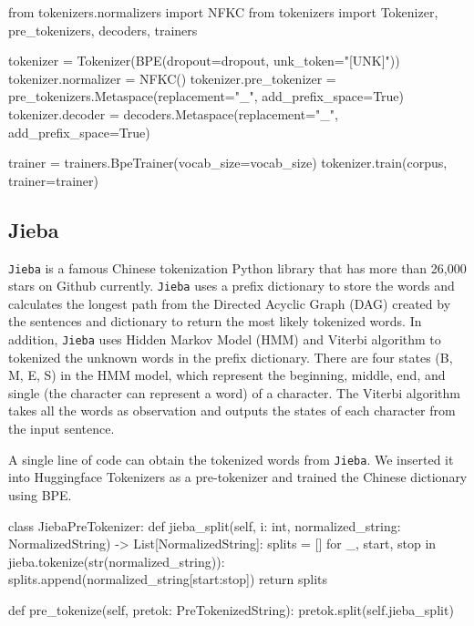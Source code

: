 \vspace{0.5cm}

\begin{python}
from tokenizers.normalizers import NFKC
from tokenizers import Tokenizer, pre_tokenizers, decoders, trainers

tokenizer = Tokenizer(BPE(dropout=dropout, unk_token="[UNK]"))
tokenizer.normalizer = NFKC()
tokenizer.pre_tokenizer = pre_tokenizers.Metaspace(replacement="_", add_prefix_space=True)
tokenizer.decoder = decoders.Metaspace(replacement="_", add_prefix_space=True)

trainer = trainers.BpeTrainer(vocab_size=vocab_size)
tokenizer.train(corpus, trainer=trainer)
\end{python}

\subsection{Jieba} \label{sec:jieba}

\texttt{Jieba} is a famous Chinese tokenization Python library that has more than 26,000 stars on Github currently. \texttt{Jieba} uses a prefix dictionary to store the words and calculates the longest path from the Directed Acyclic Graph (DAG) created by the sentences and dictionary to return the most likely tokenized words. In addition, \texttt{Jieba} uses Hidden Markov Model (HMM) and Viterbi algorithm to tokenized the unknown words in the prefix dictionary. There are four states (B, M, E, S) in the HMM model, which represent the beginning, middle, end, and single (the character can represent a word) of a character. The Viterbi algorithm takes all the words as observation and outputs the states of each character from the input sentence. 

A single line of code  can obtain the tokenized words from \texttt{Jieba}. We inserted it into Huggingface Tokenizers as a pre-tokenizer and trained the Chinese dictionary using BPE.

\vspace{0.5cm}

\begin{python}
    class JiebaPreTokenizer:
    def jieba_split(self, i: int, normalized_string: NormalizedString) -> List[NormalizedString]:
        splits = []
        for _, start, stop in jieba.tokenize(str(normalized_string)):
            splits.append(normalized_string[start:stop])
        return splits
    
    def pre_tokenize(self, pretok: PreTokenizedString):
         pretok.split(self.jieba_split)
\end{python}


